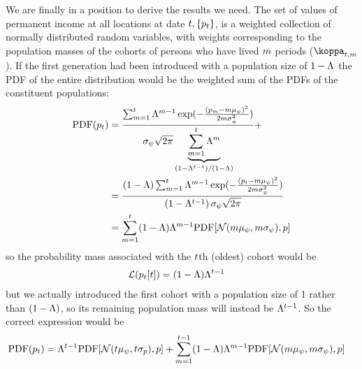 \documentclass[\econtexRoot/BufferStockTheory.tex]{subfiles}
\begin{document}
We are finally in a position to derive the results we need.
The set of values of permanent income at all locations at date $t,\{p_{t}\}$, is a weighted collection of normally distributed random variables, with weights corresponding to the population masses of the cohorts of persons who have lived $m$ periods ($\wgt_{\FutPer,\LooPer}$).  If the first generation had been introduced with a population size of $1-\Lambda$ the PDF of the entire distribution would be the weighted sum of the PDFs of the constituent populations:
\begin{align}\label{eq:limInvariantP}
  \textrm{PDF}(p_{t}) & = \frac{\sum _{m=1}^{t} 
                          \Lambda^{m-1}
                          \exp({-\frac{(p_{m}-m \mu_{\psi} )^2}{2
                          m \sigma_{\psi} ^2}})}{
                          \sigma_{\psi} \sqrt{2 \pi }
                          \underbrace{
                          \sum_{m=1}^{t}\Lambda^{m}
                          }_{\left(1-\Lambda^{t-1}\right)/(1-\Lambda)}
                          }+
  \\ &= \frac{                            \left(1-\Lambda\right) \sum _{m=1}^{t} 
       \Lambda^{m-1}
       \exp({-\frac{(p_{t}-m \mu_{\psi} )^2}{
       2                      m \sigma_{\psi} ^2}})}{
       \left(1-\Lambda^{t-1}\right)
       \sigma_{\psi} \sqrt{2 \pi }
       }
  \\     & = \sum_{m=1}^{t}(1-\Lambda)\Lambda^{m-1} \textrm{PDF}[\mathcal{N}(m \mu_{\psi},m \sigma_{\psi}),p] \label{eq:pdfsum}
\end{align}
so the probability mass associated with the $t$th (oldest) cohort would be
\begin{align}
  \mathcal{L}(p_{t}[t]) &= (1-\Lambda)\Lambda^{t-1}
                                     \label{eq:wgtLast}
\end{align}
but we actually introduced the first cohort with a population size of 1 rather than $(1-\Lambda)$, so its remaining population mass will instead be $\Lambda^{t-1}$. So the correct expression would be 
\begin{align}
  \textrm{PDF}(p_{t})      & = \Lambda^{t-1}\textrm{PDF}[\mathcal{N}(t \mu_{\psi}, t \sigma_{p}),p]+\sum_{m=1}^{t-1}(1-\Lambda)\Lambda^{m-1} \textrm{PDF}[\mathcal{N}(m \mu_{\psi},m \sigma_{\psi}),p] \label{eq:PDFp}
\end{align}
\end{document}
